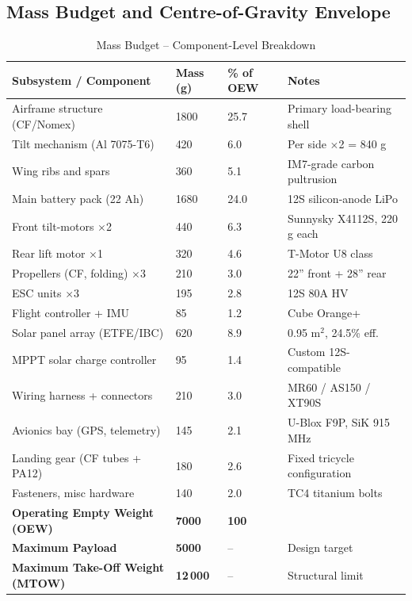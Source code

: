 \subsection{Mass Budget and Centre-of-Gravity Envelope}

\begin{table}[H]
\centering
\small
\caption{Mass Budget -- Component-Level Breakdown}
\begin{tabularx}{\textwidth}{L{5cm} C{2.2cm} C{2.2cm} X}
\toprule
\textbf{Subsystem / Component} &
\textbf{Mass (g)} &
\textbf{\% of OEW} &
\textbf{Notes} \\
\midrule
Airframe structure (CF/Nomex)      & 1800 & 25.7 & Primary load-bearing shell \\
Tilt mechanism (Al 7075-T6)        & 420  & 6.0  & Per side $\times$2 = 840 g \\
Wing ribs and spars                & 360  & 5.1  & IM7-grade carbon pultrusion \\
Main battery pack (22 Ah)          & 1680 & 24.0 & 12S silicon-anode LiPo \\
Front tilt-motors $\times$2        & 440  & 6.3  & Sunnysky X4112S, 220 g each \\
Rear lift motor $\times$1          & 320  & 4.6  & T-Motor U8 class \\
Propellers (CF, folding) $\times$3 & 210  & 3.0  & 22'' front + 28'' rear \\
ESC units $\times$3                & 195  & 2.8  & 12S 80A HV \\
Flight controller + IMU            & 85   & 1.2  & Cube Orange+ \\
Solar panel array (ETFE/IBC)       & 620  & 8.9  & 0.95 m$^2$, 24.5\% eff. \\
MPPT solar charge controller       & 95   & 1.4  & Custom 12S-compatible \\
Wiring harness + connectors        & 210  & 3.0  & MR60 / AS150 / XT90S \\
Avionics bay (GPS, telemetry)      & 145  & 2.1  & U-Blox F9P, SiK 915 MHz \\
Landing gear (CF tubes + PA12)     & 180  & 2.6  & Fixed tricycle configuration \\
Fasteners, misc hardware           & 140  & 2.0  & TC4 titanium bolts \\
\midrule
\textbf{Operating Empty Weight (OEW)}   & \textbf{7000}  & \textbf{100} & \\
\textbf{Maximum Payload}                & \textbf{5000}  & --           & Design target \\
\textbf{Maximum Take-Off Weight (MTOW)} & \textbf{12\,000} & --         & Structural limit \\
\bottomrule
\end{tabularx}
\end{table}

